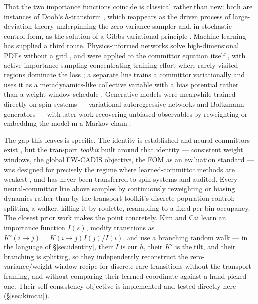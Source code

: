 \documentclass[a4paper,fleqn]{cas-sc}
\begin{document}
	That the two importance functions coincide is classical rather than new: both are instances
	of Doob's $h$-transform \cite{doob1984}, which reappears as the driven process of
	large-deviation theory underpinning the zero-variance sampler
	\cite{chetrite2015, touchette2009} and, in stochastic-control form, as the solution of a
	Gibbs variational principle \cite{hartmann2019}. Machine learning has supplied a third route.
	Physics-informed networks solve high-dimensional PDEs without a grid \cite{raissi2019}, and
	were applied to the committor equation itself \cite{li2019, khoo2019}, with active importance
	sampling concentrating training effort where rarely visited regions dominate the loss
	\cite{rotskoff2020}; a separate line trains a committor variationally and uses it as a
	metadynamics-like collective variable with a bias potential rather than a weight-window
	schedule \cite{trizio2025}. Generative models were meanwhile trained directly on spin systems
	--- variational autoregressive networks \cite{wu2019} and Boltzmann generators
	\cite{noe2019} --- with later work recovering unbiased observables by reweighting
	\cite{nicoli2020} or embedding the model in a Markov chain \cite{gabrie2022}.
	
	The gap this leaves is specific. The identity is established \cite{doob1984, chetrite2015} and
	neural committors exist \cite{li2019, khoo2019, trizio2025}, but the transport \emph{toolkit}
	built around that identity --- consistent weight windows, the global FW-CADIS objective, the
	FOM as an evaluation standard --- was designed for precisely the regime where
	learned-committor methods are weakest \cite{wagner1998, wagnerfw2014}, and has never been
	transferred to spin systems and audited. Every neural-committor line above samples by
	continuously reweighting or biasing dynamics rather than by the transport toolkit's discrete
	population control: splitting a walker, killing it by roulette, resampling to a fixed per-bin
	occupancy. The closest prior work makes the point concretely. Kim and Cai \cite{kim2026}
	learn an importance function $I(s)$, modify transitions as $K'(i\to j)=K(i\to j)I(j)/I(i)$,
	and use a branching random walk --- in the language of \S\ref{sec:identity}, their $I$ is our
	$h$, their $K'$ is the tilt, and their branching is splitting, so they independently
	reconstruct the zero-variance/weight-window recipe for discrete rare transitions without the
	transport framing, and without comparing their learned coordinate against a hand-picked one.
	Their self-consistency objective is implemented and tested directly here
	(\S\ref{sec:kimcai}).
	
\end{document}
